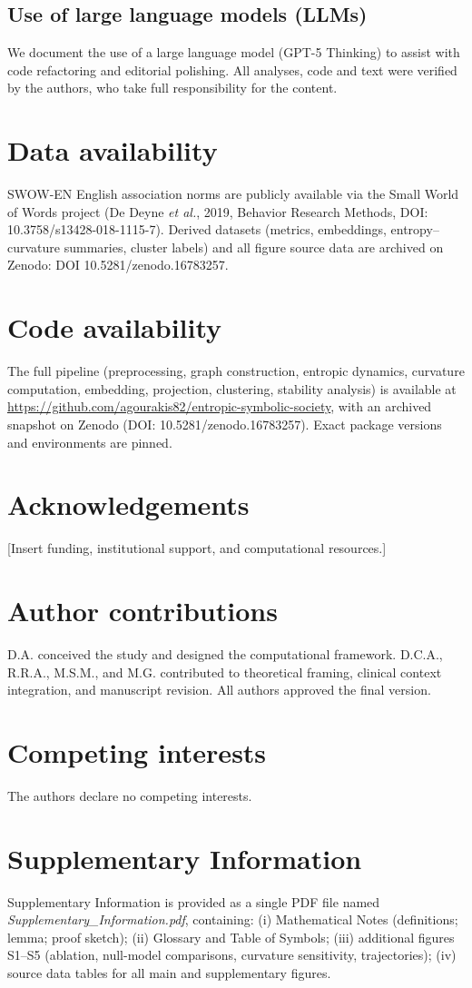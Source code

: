 \documentclass[fleqn,10pt]{wlscirep}
\begin{document}
\subsection*{Use of large language models (LLMs)}
We document the use of a large language model (GPT-5 Thinking) to assist with code refactoring and editorial polishing. All analyses, code and text were verified by the authors, who take full responsibility for the content.

\section*{Data availability}
SWOW-EN English association norms are publicly available via the Small World of Words project (De Deyne \emph{et al.}, 2019, Behavior Research Methods, DOI: 10.3758/s13428-018-1115-7). Derived datasets (metrics, embeddings, entropy--curvature summaries, cluster labels) and all figure source data are archived on Zenodo: DOI 10.5281/zenodo.16783257.

\section*{Code availability}
The full pipeline (preprocessing, graph construction, entropic dynamics, curvature computation, embedding, projection, clustering, stability analysis) is available at \url{https://github.com/agourakis82/entropic-symbolic-society}, with an archived snapshot on Zenodo (DOI: 10.5281/zenodo.16783257). Exact package versions and environments are pinned.

\section*{Acknowledgements}
[Insert funding, institutional support, and computational resources.]

\section*{Author contributions}
D.A. conceived the study and designed the computational framework. D.C.A., R.R.A., M.S.M., and M.G. contributed to theoretical framing, clinical context integration, and manuscript revision. All authors approved the final version.

\section*{Competing interests}
The authors declare no competing interests.

\section*{Supplementary Information}
Supplementary Information is provided as a single PDF file named \emph{Supplementary\_Information.pdf}, containing: (i) Mathematical Notes (definitions; lemma; proof sketch); (ii) Glossary and Table of Symbols; (iii) additional figures S1--S5 (ablation, null-model comparisons, curvature sensitivity, trajectories); (iv) source data tables for all main and supplementary figures.


\end{document}
